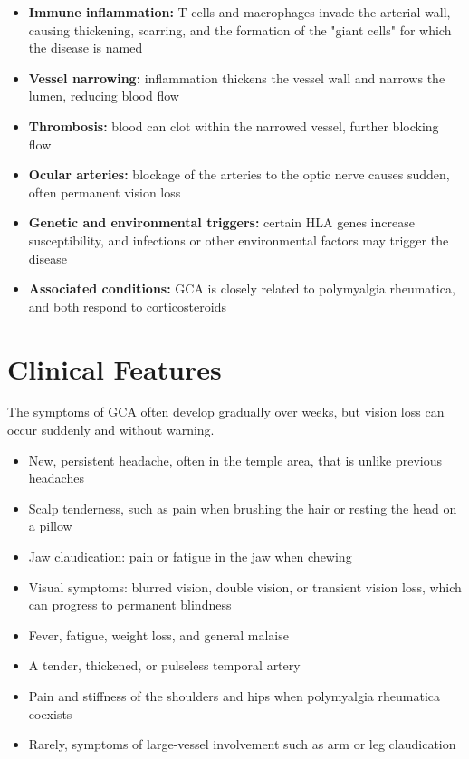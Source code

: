 \begin{itemize}
    \item \textbf{Immune inflammation:} T-cells and macrophages invade the arterial wall, causing thickening, scarring, and the formation of the "giant cells" for which the disease is named
    \item \textbf{Vessel narrowing:} inflammation thickens the vessel wall and narrows the lumen, reducing blood flow
    \item \textbf{Thrombosis:} blood can clot within the narrowed vessel, further blocking flow
    \item \textbf{Ocular arteries:} blockage of the arteries to the optic nerve causes sudden, often permanent vision loss
    \item \textbf{Genetic and environmental triggers:} certain HLA genes increase susceptibility, and infections or other environmental factors may trigger the disease
    \item \textbf{Associated conditions:} GCA is closely related to polymyalgia rheumatica, and both respond to corticosteroids
\end{itemize}

\section*{Clinical Features}
The symptoms of GCA often develop gradually over weeks, but vision loss can occur suddenly and without warning.

\begin{itemize}
    \item New, persistent headache, often in the temple area, that is unlike previous headaches
    \item Scalp tenderness, such as pain when brushing the hair or resting the head on a pillow
    \item Jaw claudication: pain or fatigue in the jaw when chewing
    \item Visual symptoms: blurred vision, double vision, or transient vision loss, which can progress to permanent blindness
    \item Fever, fatigue, weight loss, and general malaise
    \item A tender, thickened, or pulseless temporal artery
    \item Pain and stiffness of the shoulders and hips when polymyalgia rheumatica coexists
    \item Rarely, symptoms of large-vessel involvement such as arm or leg claudication
\end{itemize}


